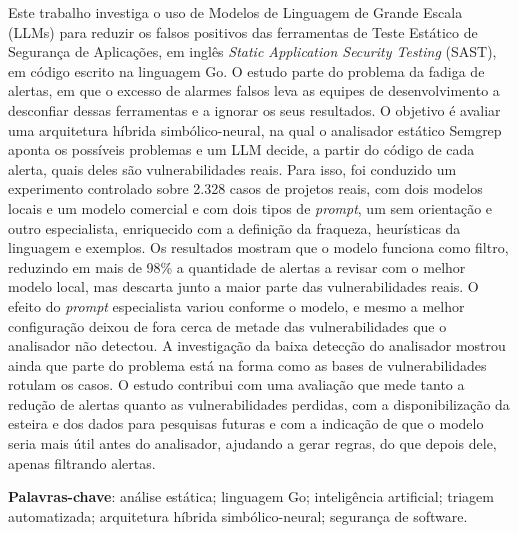 \begin{resumo}
Este trabalho investiga o uso de Modelos de Linguagem de Grande Escala (LLMs) para reduzir os falsos positivos das ferramentas de Teste Estático de Segurança de Aplicações, em inglês \textit{Static Application Security Testing} (SAST), em código escrito na linguagem Go. O estudo parte do problema da fadiga de alertas, em que o excesso de alarmes falsos leva as equipes de desenvolvimento a desconfiar dessas ferramentas e a ignorar os seus resultados. O objetivo é avaliar uma arquitetura híbrida simbólico-neural, na qual o analisador estático Semgrep aponta os possíveis problemas e um LLM decide, a partir do código de cada alerta, quais deles são vulnerabilidades reais. Para isso, foi conduzido um experimento controlado sobre 2.328 casos de projetos reais, com dois modelos locais e um modelo comercial e com dois tipos de \textit{prompt}, um sem orientação e outro especialista, enriquecido com a definição da fraqueza, heurísticas da linguagem e exemplos. Os resultados mostram que o modelo funciona como filtro, reduzindo em mais de 98\% a quantidade de alertas a revisar com o melhor modelo local, mas descarta junto a maior parte das vulnerabilidades reais. O efeito do \textit{prompt} especialista variou conforme o modelo, e mesmo a melhor configuração deixou de fora cerca de metade das vulnerabilidades que o analisador não detectou. A investigação da baixa detecção do analisador mostrou ainda que parte do problema está na forma como as bases de vulnerabilidades rotulam os casos. O estudo contribui com uma avaliação que mede tanto a redução de alertas quanto as vulnerabilidades perdidas, com a disponibilização da esteira e dos dados para pesquisas futuras e com a indicação de que o modelo seria mais útil antes do analisador, ajudando a gerar regras, do que depois dele, apenas filtrando alertas.


 \vspace{\onelineskip}
    
 \noindent
 \textbf{Palavras-chave}: análise estática; linguagem Go; inteligência artificial; triagem automatizada; arquitetura híbrida simbólico-neural; segurança de software.
\end{resumo}
